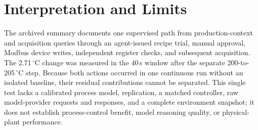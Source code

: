 \documentclass[10pt]{article}
\begin{document}
\section{Interpretation and Limits}
The archived summary documents one supervised path from production-context and
acquisition queries through an agent-issued recipe trial, manual approval,
Modbus device writes, independent register checks, and subsequent acquisition.
The 2.71\,$^{\circ}$C change was measured in the 40\,s window after the
separate 200-to-205\,$^{\circ}$C step. Because both actions occurred in one
continuous run without an isolated baseline, their residual contributions
cannot be separated. This single test lacks a calibrated process model,
replication, a matched controller, raw model-provider requests and responses,
and a complete environment snapshot; it does not establish process-control
benefit, model reasoning quality, or physical-plant performance.
\end{document}
